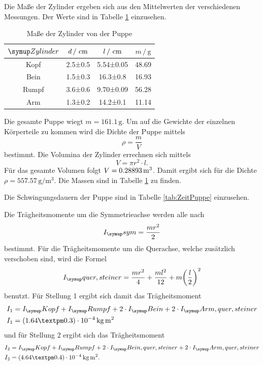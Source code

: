 \newpage
\noindent Die Maße der Zylinder ergeben sich aus den Mittelwerten der verschiedenen Messungen.
Der Werte sind in Tabelle \ref{tab:wertepuppe} einzusehen.
\begin{table}
  \centering
  \begin{tabular}{c c c c}
    \toprule
    $\su{Zylinder}$ & $d \,/\,\,\si{\centi\meter}$ & $l\,/\,\,\si{\centi\meter}$ & $ m\,/\,\si{\gram}$ \\
    \midrule
    Kopf & 2.5±0.5 & 5.54±0.05 & 48.69 \\
    Bein & 1.5±0.3 & 16.3±0.8 & 16.93 \\
    Rumpf & 3.6±0.6 & 9.70±0.09 & 56.28 \\
    Arm & 1.3±0.2 & 14.2±0.1 & 11.14 \\
    \bottomrule
  \end{tabular}
  \caption{Maße der Zylinder von der Puppe}
  \label{tab:wertepuppe}
\end{table}
Die gesamte Puppe wiegt $m = 161.1\,\si{\gram}$. Um auf die Gewichte der einzelnen
Körperteile zu kommen wird die Dichte der Puppe mittels
\begin{equation}
  \rho = \frac{m}{V}
\end{equation}
bestimmt. Die Volumina der Zylinder errechnen sich mittels
\begin{equation}
  V = \pi r^2 \cdot l.
\end{equation}
Für das gesamte Volumen folgt $V = 0.28893 \,\si{\cubic\meter}$. Damit ergibt sich für die
Dichte $ \rho = 557.57 \,\si{\gram\per\cubic\meter}$. Die Massen sind
in Tabelle \ref{tab:wertepuppe} zu finden.

Die Schwingungsdauern der Puppe sind in Tabelle \ref{tab:ZeitPuppe} einzusehen.


Die Trägheitsmomente um die Symmetrieachse werden alle nach
\begin{equation}
  I_\su{sym} = \frac{mr^2}{2}
\end{equation}
bestimmt.
Für die Trägheitsmomente um die Querachse, welche zusätzlich verschoben sind,
wird die Formel
\begin{equation}
  I_\su{quer,steiner} = \frac{mr^2}{4} + \frac{ml^2}{12} + m \biggl(\frac{l}{2}\biggr)^2
\end{equation}
benutzt.
Für Stellung 1 ergibt sich damit das Trägheitsmoment
\begin{align}
  I_1 &= I_\su{Kopf} + I_\su{Rumpf} + 2 \cdot I_\su{Bein} + 2 \cdot I_\su{Arm,quer,steiner} \\
  I_1 &= (1.64 ± 0.3) \cdot 10^{-4} \,\si{\kilo\gram\square\meter}
\end{align}
und für Stellung 2 ergibt sich das Trägheitsmoment
\begin{align}
  I_2 &= I_\su{Kopf} + I_\su{Rumpf} + 2 \cdot I_\su{Bein,quer,steiner} + 2 \cdot I_\su{Arm,quer,steiner} \\
  I_2 &= (4.64 ± 0.4) \cdot 10^{-4} \,\si{\kilo\gram\square\meter}.
\end{align}

